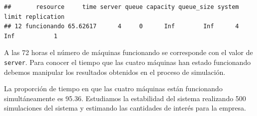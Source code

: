\documentclass[
]{book}
\newenvironment{Shaded}{\begin{snugshade}}{\end{snugshade}}
\newcommand{\AttributeTok}[1]{\textcolor[rgb]{0.77,0.63,0.00}{#1}}
\newcommand{\ConstantTok}[1]{\textcolor[rgb]{0.00,0.00,0.00}{#1}}
\newcommand{\DecValTok}[1]{\textcolor[rgb]{0.00,0.00,0.81}{#1}}
\newcommand{\DocumentationTok}[1]{\textcolor[rgb]{0.56,0.35,0.01}{\textbf{\textit{#1}}}}
\newcommand{\FunctionTok}[1]{\textcolor[rgb]{0.00,0.00,0.00}{#1}}
\newcommand{\NormalTok}[1]{#1}
\newcommand{\OtherTok}[1]{\textcolor[rgb]{0.56,0.35,0.01}{#1}}
\newcommand{\SpecialCharTok}[1]{\textcolor[rgb]{0.00,0.00,0.00}{#1}}
\newcommand{\StringTok}[1]{\textcolor[rgb]{0.31,0.60,0.02}{#1}}
\theoremstyle{definition}
\theoremstyle{definition}
\theoremstyle{definition}
\theoremstyle{definition}
\theoremstyle{remark}
\begin{document}
\begin{verbatim}
##       resource     time server queue capacity queue_size system limit replication
## 12 funcionando 65.62617      4     0      Inf        Inf      4   Inf           1
\end{verbatim}

A las 72 horas el número de máquinas funcionando se corresponde con el valor de \texttt{server}. Para conocer el tiempo que las cuatro máquinas han estado funcionando debemos manipular los resultados obtenidos en el proceso de simulación.

\begin{Shaded}
\end{Shaded}

La proporción de tiempo en que las cuatro máquinas están funcionando simultáneamente es 95.36. Estudiamos la estabilidad del sistema realizando 500 simulaciones del sistema y estimando las cantidades de interés para la empresa.
\end{document}
